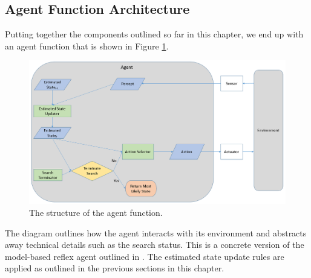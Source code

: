 \subsection{Agent Function Architecture}\label{subsec:AgentFNArch}
Putting together the components outlined so far in this chapter, we end up with an agent function that is shown in Figure \ref{fig:BasicAgentArchitecture}. 

\begin{figure}
    \centering
    \includegraphics[width = 0.75\linewidth]{Chapters/MultiAgentTargetDetection/Figs/AgentFnArchitecture/BasicAgentFunctionNoCommunication.PNG}
    \caption{The structure of the agent function.}
    \label{fig:BasicAgentArchitecture}
\end{figure}


The diagram outlines how the agent interacts with its environment and abstracts away technical details such as the search status. This is a concrete version of the model-based reflex agent outlined in \cite[P~.51]{AIAMA}. The estimated state update rules are applied as outlined in the previous sections in this chapter.
